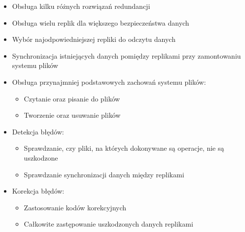 \begin{itemize}
    \item Obsługa kilku różnych rozwiązań redundancji
    \item Obsługa wielu replik dla większego bezpieczeństwa danych 
    \item Wybór najodpowiedniejszej repliki do odczytu danych
    \item Synchronizacja istniejących danych pomiędzy replikami przy zamontowaniu systemu plików
	\item Obsługa przynajmniej podstawowych zachowań systemu plików:
		\begin{itemize}
			\item Czytanie oraz pisanie do plików
			\item Tworzenie oraz usuwanie plików
		\end{itemize}
	\item Detekcja błędów:
		\begin{itemize}
			\item Sprawdzanie, czy pliki, na których dokonywane są operacje, nie są uszkodzone
			\item Sprawdzanie synchronizacji danych między replikami
		\end{itemize}
	\item Korekcja błędów:
		\begin{itemize}
			\item Zastosowanie kodów korekcyjnych
			\item Całkowite zastępowanie uszkodzonych danych replikami
		\end{itemize}
\end{itemize}


